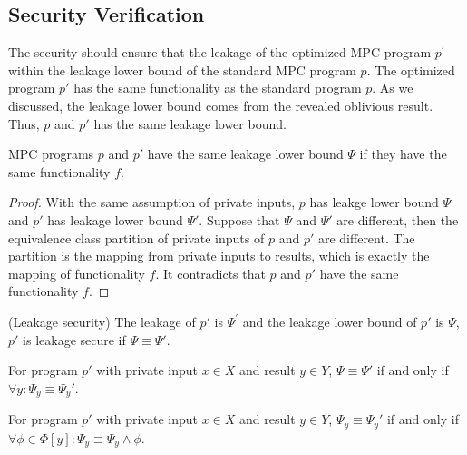 \subsection{Security Verification}
The security should ensure that the leakage of the optimized MPC program $p^\prime$ within the leakage lower bound of the standard MPC program $p$.
The optimized program $p'$ has the same functionality as the standard program $p$.
As we discussed, the leakage lower bound comes from the revealed oblivious result.
Thus, $p$ and $p'$ has the same leakage lower bound.
\begin{theorem}
    MPC programs $p$ and $p'$ have the same leakage lower bound $\Psi$ if they have the same functionality $f$.
\end{theorem}
\begin{proof}
    With the same assumption of private inputs, $p$ has leakge lower bound $\Psi$ and $p'$ has leakage lower bound $\Psi'$.
    Suppose that $\Psi$ and $\Psi'$ are different, then the equivalence class partition of private inputs of $p$ and $p'$ are different.
    The partition is the mapping from private inputs to results, which is exactly the mapping of functionality $f$.
    It contradicts that $p$ and $p'$ have the same functionality $f$.
\end{proof}
\begin{theorem}(Leakage security)
    The leakage of $p'$ is $\Psi^\prime$ and the leakage lower bound of $p'$ is $\Psi$, $p'$ is leakage secure if $\Psi \equiv \Psi'$.
\end{theorem}

\begin{corollary}
    For program $p'$ with private input $x\in X$ and result $y\in Y$, $\Psi \equiv \Psi'$ if and only if $\forall y: \Psi_{y}\equiv\Psi_{y}'$.
\end{corollary}

\begin{corollary}
    For program $p'$ with private input $x\in X$ and result $y\in Y$,
    $\Psi_y \equiv \Psi_y'$ if and only if $\forall \phi\in \Phi[y]: \Psi_{y}\equiv\Psi_{y}\land \phi $.
\end{corollary}

